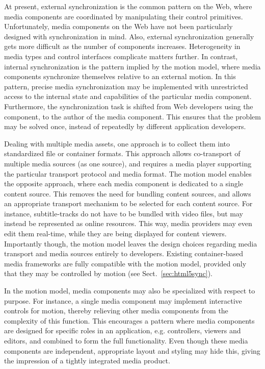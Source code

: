 
At present, external synchronization is the common pattern on the Web, where
media components are coordinated by manipulating their control primitives.
Unfortunately, media components on the Web have not been particularly designed
with synchronization in mind. Also, external synchronization generally gets
more difficult as the number of components increases. Heterogeneity in media
types and control interfaces complicate matters further. In contrast, internal
synchronization is the pattern implied by the motion model, where media
components synchronize themselves relative to an external motion. In this
pattern, precise media synchronization may be implemented with unrestricted
access to the internal state and capabilities of the particular media
component. Furthermore, the synchronization task is shifted from Web
developers using the component, to the author of the media component. This
ensures that the problem may be solved once, instead of repeatedly by
different application developers.



Dealing with multiple media assets, one approach is to collect them into
standardized file or container formats. This approach allows co-transport of
multiple media sources (as one source), and requires a media player supporting
the particular transport protocol and media format. The motion model enables
the opposite approach, where each media component is dedicated to a single
content source. This removes the need for bundling content sources, and allows
an appropriate transport mechanism to be selected for each content source. For
instance, subtitle-tracks do not have to be bundled with video files, but may
instead be represented as online resources. This way, media providers may even
edit them real-time, while they are being displayed for content viewers.
Importantly though, the motion model leaves the design choices regarding media
transport and media sources entirely to developers. Existing container-based
media frameworks are fully compatible with the motion model, provided only
that they may be controlled by motion (see Sect.~\ref{sec:html5sync}).


In the motion model, media components may also be specialized with respect to
purpose. For instance, a single media component may implement interactive
controls for motion, thereby relieving other media components from the
complexity of this function. This encourages a pattern where media components
are designed for specific roles in an application, e.g. controllers, viewers
and editors, and combined to form the full functionality. Even though these
media components are independent, appropriate layout and styling may hide
this, giving the impression of a tightly integrated media product.

